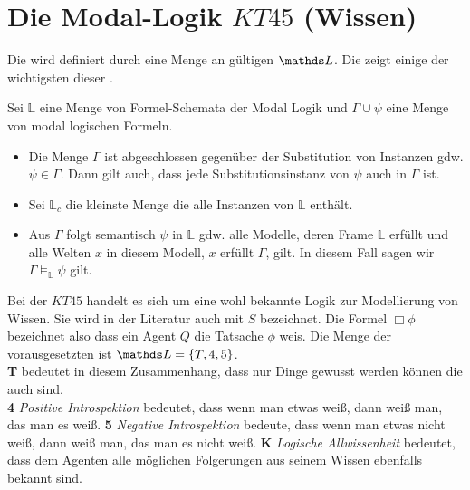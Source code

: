 

\section{Die Modal-Logik $KT45$ (Wissen)} %
\label{sub:the_normal_modal_logic_s5_}

Die \ML wird definiert durch eine Menge an gültigen \formelSchemata $\Menge{L}$.
Die  zeigt einige der wichtigsten dieser \formelSchemata.

\begin{definition}
	\label{def:substitution}
	Sei $\mathds{L}$ eine Menge von Formel-Schemata der Modal Logik und $\Gamma \cup {\psi}$ eine Menge von modal logischen Formeln.
	
	\begin{itemize}
		\item Die Menge $\Gamma$ ist abgeschlossen gegenüber der Substitution von Instanzen gdw.  $\psi \in \Gamma$. 
		Dann gilt auch, dass jede Substitutionsinstanz von $\psi$ auch in $\Gamma$ ist.
		\item Sei $\mathds{L}_c$ die kleinste Menge die alle Instanzen von $\mathds{L}$ enthält.
		\item Aus $\Gamma$ folgt semantisch $\psi$ in $\mathds{L}$ gdw. alle Modelle, deren Frame $\mathds{L}$ erfüllt und alle Welten $x$ in diesem Modell, $x$ erfüllt $\Gamma$, gilt.
		In diesem Fall sagen wir $\Gamma \vDash_{\mathds{L}} \psi$ gilt.
	\end{itemize}
	\cite[S.326]{huth2004logic}
\end{definition}

Bei der \ML $KT45$ handelt es sich um eine wohl bekannte Logik zur Modellierung von Wissen.
Sie wird in der Literatur auch mit $S$ bezeichnet.
Die Formel $\Box \phi$ bezeichnet also dass ein Agent $Q$ die Tatsache $\phi$ weis.
Die Menge der vorausgesetzten \formelSchemata ist $\Menge{L} = \{T, 4, 5\}$.\\
\textbf{T} bedeutet in diesem Zusammenhang, dass nur Dinge gewusst werden können die auch \true sind.\\
\textbf{4} \emph{Positive Introspektion} bedeutet, dass wenn man etwas weiß, dann weiß man, das man es weiß.
\textbf{5} \emph{Negative Introspektion} bedeute, dass wenn man etwas nicht weiß, dann weiß man, das man es nicht weiß.
\textbf{K} \emph{Logische Allwissenheit} bedeutet, dass dem Agenten alle möglichen Folgerungen aus seinem Wissen ebenfalls bekannt sind.

